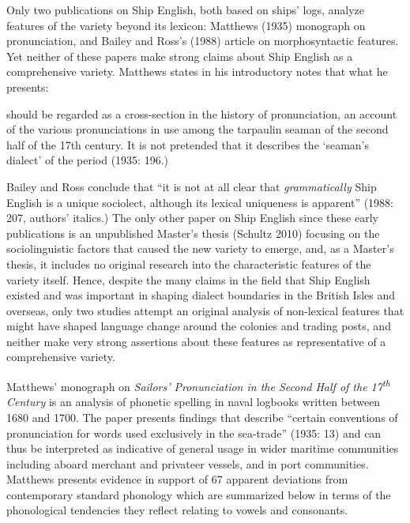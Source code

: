 \begin{styleStandard}
Only two publications on Ship English, both based on ships’ logs, analyze features of the variety beyond its lexicon: Matthews (1935) monograph on pronunciation, and Bailey and Ross’s (1988) article on morphosyntactic features. Yet neither of these papers make strong claims about Ship English as a comprehensive variety. Matthews states in his introductory notes that what he presents:
\end{styleStandard}

\begin{styleStandard}
should be regarded as a cross-section in the history of pronunciation, an account of the various pronunciations in use among the tarpaulin seaman of the second half of the 17th century. It is not pretended that it describes the ‘seaman’s dialect’ of the period (1935: 196.)
\end{styleStandard}

\begin{styleStandard}
Bailey and Ross conclude that “it is not at all clear that \textit{grammatically} Ship English is a unique sociolect, although its lexical uniqueness is apparent” (1988: 207, authors’ italics.) The only other paper on Ship English since these early publications is an unpublished Master’s thesis (Schultz 2010) focusing on the sociolinguistic factors that caused the new variety to emerge, and, as a Master’s thesis, it includes no original research into the characteristic features of the variety itself. Hence, despite the many claims in the field that Ship English existed and was important in shaping dialect boundaries in the British Isles and overseas, only two studies attempt an original analysis of non-lexical features that might have shaped language change around the colonies and trading posts, and neither make very strong assertions about these features as representative of a comprehensive variety. \ 
\end{styleStandard}

\begin{styleStandard}
Matthews’ monograph on \textit{Sailors’ Pronunciation in the Second Half of the 17}\textit{\textsuperscript{th}}\textit{ Century} is an analysis of phonetic spelling in naval logbooks written between 1680 and 1700. The paper presents findings that describe “certain conventions of pronunciation for words used exclusively in the sea-trade” (1935: 13) and can thus be interpreted as indicative of general usage in wider maritime communities including aboard merchant and privateer vessels, and in port communities. Matthews presents evidence in support of 67 apparent deviations from contemporary standard phonology which are summarized below in terms of the phonological tendencies they reflect relating to vowels and consonants. 
\end{styleStandard}

